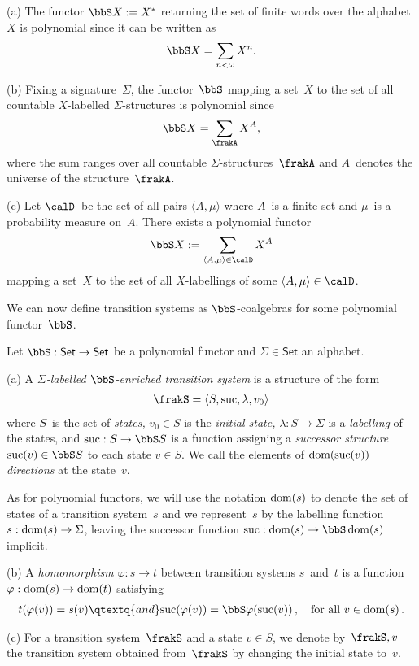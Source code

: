 \documentclass[10pt, fleqn]{scrartcl}
\DeclareRobustCommand*{\dom}{\qopname\relax o{dom}}
\newcommand*{\Set}{\mathsf{Set}}
\newcommand*{\suc}{\mathrm{suc}}
\newcommand*{\?}{\kern .08em}
\begin{document}
\begin{Exams}
(a) The functor $\bbS X := X^*$ returning the set of finite words over the alphabet~$X$
is polynomial since it can be written as
\begin{align*}
  \bbS X = \sum_{n<\omega} X^n.
\end{align*}

(b) Fixing a signature~$\Sigma$, the functor~$\bbS$ mapping a set~$X$ to the set of
all countable $X$-labelled $\Sigma$-structures is polynomial since
\begin{align*}
  \bbS X = \sum_\frakA X^A,
\end{align*}
where the sum ranges over all countable $\Sigma$-structures~$\frakA$
and $A$~denotes the universe of the structure~$\frakA$.

(c) Let $\calD$~be the set of all pairs $\langle A,\mu\rangle$ where $A$~is a finite set
and $\mu$~is a probability measure on~$A$.
There exists a polynomial functor
\begin{align*}
  \bbS X := \sum_{\langle A,\mu\rangle \in \calD} X^A
\end{align*}
mapping a set~$X$ to the set of all $X$-labellings of some $\langle A,\mu\rangle \in \calD$.
\end{Exams}

We can now define transition systems as $\bbS$-coalgebras for some polynomial functor~$\bbS$.
\begin{Def}
Let $\bbS : \Set \to \Set$ be a polynomial functor and $\Sigma \in \Set$ an alphabet.

(a)
A \emph{$\Sigma$-labelled $\bbS$-enriched transition system} is a structure of the form
\begin{align*}
  \frakS = \langle S,\suc,\lambda,v_0\rangle
\end{align*}
where $S$~is the set of \emph{states,} $v_0 \in S$ is the \emph{initial state,}
$\lambda : S \to \Sigma$ is a \emph{labelling} of the states, and $\suc : S \to \bbS S$ is
a function assigning a \emph{successor structure} $\suc(v) \in \bbS S$
to each state $v \in S$.
We call the elements of $\dom(\suc(v))$ \emph{directions} at the state~$v$.

As for polynomial functors, we will use the notation $\dom(s)$ to denote the set of states
of a transition system~$s$ and we represent~$s$ by the labelling function
$s : \dom(s) \to \Sigma$, leaving the successor function $\suc : \dom(s) \to \bbS\dom(s)$
implicit.

(b) A \emph{homomorphism} $\varphi : s \to t$ between transition systems $s$~and~$t$
is a function $\varphi : \dom(s) \to \dom(t)$ satisfying
\begin{align*}
  t(\varphi(v)) = s(v)
  \qtextq{and}
  \suc(\varphi(v)) = \bbS\varphi(\suc(v))\,,
  \quad\text{for all } v \in \dom(s)\,.
\end{align*}

(c) For a transition system~$\frakS$ and a state $v \in S$, we denote by~$\frakS,v$
the transition system obtained from~$\frakS$ by changing the initial state to~$v$.
\end{Def}
\end{document}

